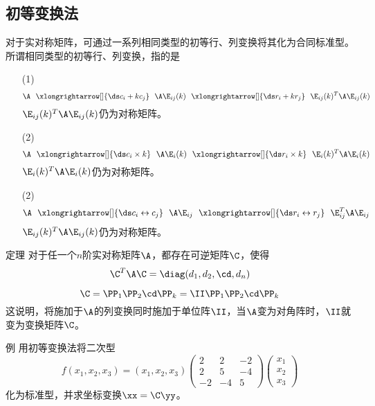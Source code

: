 \subsection{初等变换法}

\begin{frame}
  \begin{footnotesize}
    对于实对称矩阵，可通过一系列相同类型的初等行、列变换将其化为合同标准型。
    所谓相同类型的初等行、列变换，指的是
    \begin{itemize}
    \item [(1)]
      $$
      \A ~~\xlongrightarrow[]{\ds c_i+kc_j} ~~ \A\E_{ij}(k)
      ~~\xlongrightarrow[]{\ds r_i+kr_j} ~~ \E_{ij}(k)^T\A\E_{ij}(k)
      $$
      $\E_{ij}(k)^T\A\E_{ij}(k)$仍为对称矩阵。
    \item [(2)]
      $$
      \A ~~\xlongrightarrow[]{\ds c_i\times k} ~~ \A\E_{i}(k)
      ~~\xlongrightarrow[]{\ds r_i\times k} ~~ \E_{i}(k)^T\A\E_{i}(k)
      $$
      $\E_{i}(k)^T\A\E_{i}(k)$仍为对称矩阵。
    \item [(2)]
      $$
      \A ~~\xlongrightarrow[]{\ds c_i \leftrightarrow c_j} ~~ \A\E_{ij}
      ~~\xlongrightarrow[]{\ds r_i\leftrightarrow  r_j} ~~ \E_{ij}^T\A\E_{ij}
      $$
      $\E_{ij}(k)^T\A\E_{ij}(k)$仍为对称矩阵。
    \end{itemize}
  \end{footnotesize}
\end{frame}

\begin{frame}
  \begin{footnotesize}
    \begin{block}{定理}
      对于任一个$n$阶实对称矩阵$\A$，都存在可逆矩阵$\C$，使得
      $$
      \C^T\A\C=\diag(d_1,d_2,\cd,d_n)
      $$
    \end{block}

    $$
    \C=\PP_1\PP_2\cd\PP_k=\II\PP_1\PP_2\cd\PP_k
    $$
    这说明，将施加于$\A$的列变换同时施加于单位阵$\II$，当$\A$变为对角阵时，$\II$就变为变换矩阵$\C$。
  \end{footnotesize}
\end{frame}

\begin{frame}
  \begin{footnotesize}
    \begin{exampleblock}{例}
      用初等变换法将二次型
      $$
      f(x_1,x_2,x_3)=(x_1,x_2,x_3)\left(
      \begin{array}{rrr}
        2&2&-2\\
        2&5&-4\\
        -2&-4&5
      \end{array}
      \right)\left(
      \begin{array}{c}
        x_1\\x_2\\x_3
      \end{array}
      \right)
      $$
      化为标准型，并求坐标变换$\xx=\C\yy$。
    \end{exampleblock}
  \end{footnotesize}
\end{frame}

